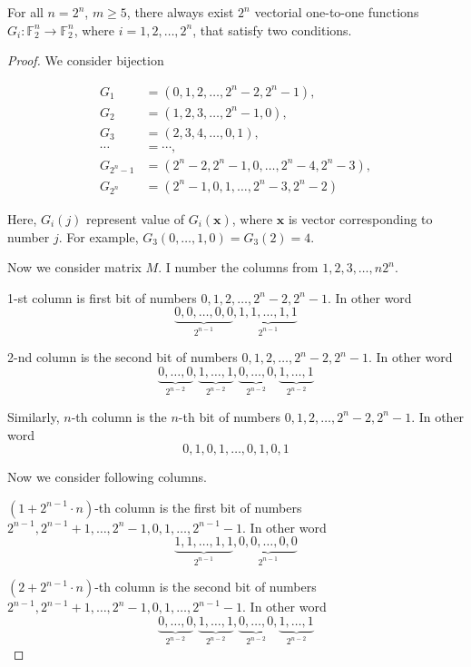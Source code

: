 \documentclass{article}
\newcommand{\FF}{\mathbb{F}}
\begin{document}
\begin{remark}
    For all $n=2^n$, $m \geqslant 5$, there always exist $2^n$ vectorial one-to-one functions $G_i: \FF_2^n \to \FF_2^n$, where $i = 1, 2, \ldots, 2^n$, that satisfy two conditions.
\end{remark}

\begin{proof}
    We consider bijection

    \begin{align*}
        G_1 & = (0, 1, 2, \ldots, 2^n-2, 2^n-1), \\
        G_2 & = (1, 2, 3, \ldots, 2^n-1, 0), \\
        G_3 & = (2, 3, 4, \ldots, 0, 1), \\
        \cdots & = \cdots, \\
        G_{2^n-1} & = (2^n-2, 2^n-1, 0, \ldots, 2^n-4, 2^n-3), \\
        G_{2^n} & = (2^n-1, 0, 1, \ldots, 2^n-3, 2^n-2)
    \end{align*}

    Here, $G_i (j)$ represent value of $G_i (\bm{x})$, where $\bm{x}$ is vector corresponding to number $j$. For example, $G_3(0, \ldots, 1, 0) = G_3(2) = 4$.

    Now we consider matrix $M$. I number the columns from $1, 2, 3, \ldots, n 2^n$.

    1-st column is first bit of numbers $0, 1, 2, \ldots, 2^n-2, 2^n-1$. In other word \[ \underbrace{0, 0, \ldots, 0, 0}_{2^{n-1}}, \underbrace{1, 1, \ldots, 1, 1}_{2^{n-1}} \]

    2-nd column is the second bit of numbers $0, 1, 2, \ldots, 2^n-2, 2^n-1$. In other word \[ \underbrace{0, \ldots, 0}_{2^{n-2}}, \underbrace{1, \ldots, 1}_{2^{n-2}}, \underbrace{0, \ldots, 0}_{2^{n-2}}, \underbrace{1, \ldots, 1}_{2^{n-2}} \]

    Similarly, $n$-th column is the $n$-th bit of numbers $0, 1, 2, \ldots, 2^n-2, 2^n-1$. In other word \[ 0, 1, 0, 1, \ldots, 0, 1, 0, 1 \]

    Now we consider following columns.

    $(1+2^{n-1} \cdot n)$-th column is the first bit of numbers $2^{n-1}, 2^{n-1}+1, \ldots, 2^n-1, 0, 1, \ldots, 2^{n-1}-1$. In other word \[ \underbrace{1, 1, \ldots, 1, 1}_{2^{n-1}}, \underbrace{0, 0, \ldots, 0, 0}_{2^{n-1}} \]

    $(2+2^{n-1} \cdot n)$-th column is the second bit of numbers $2^{n-1}, 2^{n-1}+1, \ldots, 2^n-1, 0, 1, \ldots, 2^{n-1}-1$. In other word \[ \underbrace{0, \ldots, 0}_{2^{n-2}}, \underbrace{1, \ldots, 1}_{2^{n-2}}, \underbrace{0, \ldots, 0}_{2^{n-2}}, \underbrace{1, \ldots, 1}_{2^{n-2}} \]


\end{proof}
\end{document}
